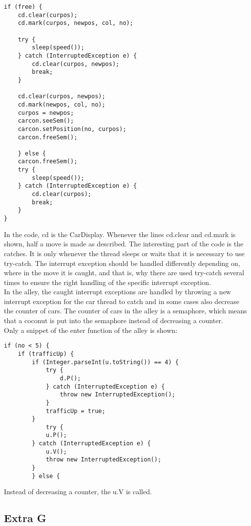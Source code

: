 \begin{lstlisting}
if (free) {
	cd.clear(curpos);
	cd.mark(curpos, newpos, col, no);

	try {
		sleep(speed());
	} catch (InterruptedException e) {
		cd.clear(curpos, newpos);
		break;
	}

	cd.clear(curpos, newpos);
	cd.mark(newpos, col, no);
	curpos = newpos;
	carcon.seeSem();
	carcon.setPosition(no, curpos);
	carcon.freeSem();

	} else {
	carcon.freeSem();
	try {
		sleep(speed());
	} catch (InterruptedException e) {
		cd.clear(curpos);
		break;
	}
}
\end{lstlisting}
\vspace{.8cm}

In the code, cd is the CarDisplay. Whenever the lines cd.clear and cd.mark is shown, half a move is made as described. The interesting part of the code is the catches. It is only whenever the thread sleeps or waits that it is necessary to use try-catch. The interrupt exception should be handled differently depending on, where in the move it is caught, and that is, why there are used try-catch several times to ensure the right handling of the specific interrupt exception. \\

In the alley, the caught interrupt exceptions are handled by throwing a new interrupt exception for the car thread to catch and in some cases also decrease the counter of cars. The counter of cars in the alley is a semaphore, which means that a coconut is put into the semaphore instead of decreasing a counter. \\
Only a snippet of the enter function of the alley is shown:

\begin{lstlisting}
if (no < 5) {
	if (trafficUp) {
		if (Integer.parseInt(u.toString()) == 4) {
			try {
				d.P();
			} catch (InterruptedException e) {
				throw new InterruptedException();
			}
			trafficUp = true;
		}
			try {
			u.P();
		} catch (InterruptedException e) {
			u.V();
			throw new InterruptedException();
		}
		} else {
\end{lstlisting}
\vspace{.8cm}

Instead of decreasing a counter, the u.V is called.

\subsection{Extra G}
